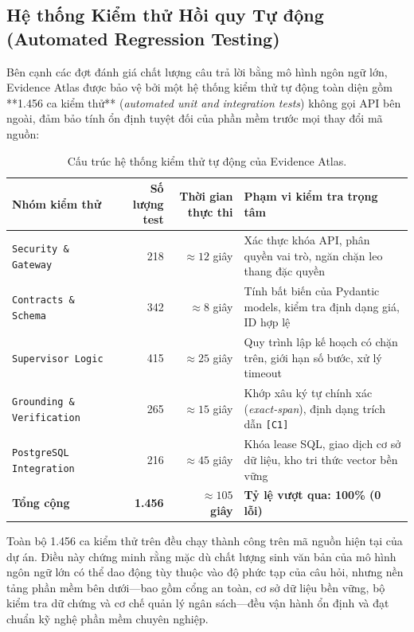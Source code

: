 \subsection{Hệ thống Kiểm thử Hồi quy Tự động (Automated Regression Testing)}
Bên cạnh các đợt đánh giá chất lượng câu trả lời bằng mô hình ngôn ngữ lớn, Evidence Atlas được bảo vệ bởi một hệ thống kiểm thử tự động toàn diện gồm **1.456 ca kiểm thử** (\textit{automated unit and integration tests}) không gọi API bên ngoài, đảm bảo tính ổn định tuyệt đối của phần mềm trước mọi thay đổi mã nguồn:

\begin{table}[htbp]\small
\caption{Cấu trúc hệ thống kiểm thử tự động của Evidence Atlas.}
\begin{tabularx}{\linewidth}{lrrY}\toprule
Nhóm kiểm thử & Số lượng test & Thời gian thực thi & Phạm vi kiểm tra trọng tâm\\\midrule
\texttt{Security \& Gateway} & 218 & $\approx 12$ giây & Xác thực khóa API, phân quyền vai trò, ngăn chặn leo thang đặc quyền\\
\texttt{Contracts \& Schema} & 342 & $\approx 8$ giây & Tính bất biến của Pydantic models, kiểm tra định dạng giá, ID hợp lệ\\
\texttt{Supervisor Logic} & 415 & $\approx 25$ giây & Quy trình lập kế hoạch có chặn trên, giới hạn số bước, xử lý timeout\\
\texttt{Grounding \& Verification} & 265 & $\approx 15$ giây & Khớp xâu ký tự chính xác (\textit{exact-span}), định dạng trích dẫn \texttt{[C1]}\\
\texttt{PostgreSQL Integration} & 216 & $\approx 45$ giây & Khóa lease SQL, giao dịch cơ sở dữ liệu, kho tri thức vector bền vững\\\midrule
\textbf{Tổng cộng} & \textbf{1.456} & \textbf{$\approx 105$ giây} & \textbf{Tỷ lệ vượt qua: 100\% (0 lỗi)}\\\bottomrule
\end{tabularx}
\end{table}

Toàn bộ 1.456 ca kiểm thử trên đều chạy thành công trên mã nguồn hiện tại của dự án. Điều này chứng minh rằng mặc dù chất lượng sinh văn bản của mô hình ngôn ngữ lớn có thể dao động tùy thuộc vào độ phức tạp của câu hỏi, nhưng nền tảng phần mềm bên dưới—bao gồm cổng an toàn, cơ sở dữ liệu bền vững, bộ kiểm tra dữ chứng và cơ chế quản lý ngân sách—đều vận hành ổn định và đạt chuẩn kỹ nghệ phần mềm chuyên nghiệp.

